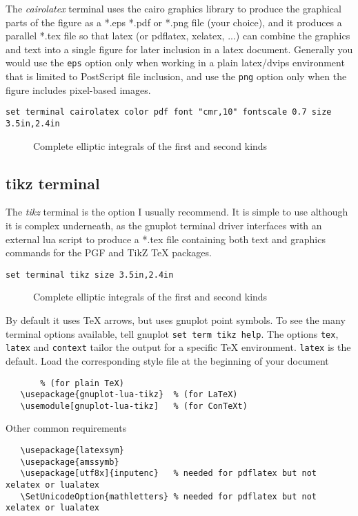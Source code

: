\documentclass[letterpaper,11pt]{article}
\newcommand{\gpinsetfigure}[2]{
  \begin{figure}[H]
  \centering
  
  \caption{#2}
  \end{figure}
}
\begin{document}
The {\em cairolatex} terminal uses the cairo graphics library to produce
the graphical parts of the figure as a *.eps *.pdf or *.png file (your choice),
and it produces a parallel *.tex file so that latex (or pdflatex, xelatex, ...)
can combine the graphics and text into a single figure for later inclusion in a
latex document.  Generally you would use the {\tt eps} option only when working
in a plain latex/dvips environment that is limited to PostScript file inclusion,
and use the {\tt png} option only when the figure includes pixel-based images.

\begin{verbatim}
set terminal cairolatex color pdf font "cmr,10" fontscale 0.7 size 3.5in,2.4in
\end{verbatim}
\gpinsetfigure{latex_cairo}
              {Complete elliptic integrals of the first and second kinds}


\subsection*{tikz terminal}

The {\em tikz} terminal is the option I usually recommend.
It is simple to use although it is complex underneath, as the gnuplot
terminal driver interfaces with an external lua script to produce a *.tex file
containing both text and graphics commands for the PGF and TikZ {\TeX} packages.

\begin{verbatim}
set terminal tikz size 3.5in,2.4in
\end{verbatim}
\gpinsetfigure{latex_tikz}
              {Complete elliptic integrals of the first and second kinds}

By default it uses {\TeX} arrows, but uses gnuplot point symbols.
To see the many terminal options available, tell gnuplot {\tt set term tikz help}.
The options {\tt tex}, {\tt latex} and {\tt context} tailor the output for
a specific {\TeX} environment.  {\tt latex} is the default.
Load the corresponding style file at the beginning of your document
\begin{verbatim}
       % (for plain TeX)
   \usepackage{gnuplot-lua-tikz}  % (for LaTeX)
   \usemodule[gnuplot-lua-tikz]   % (for ConTeXt)
\end{verbatim}
Other common requirements
\begin{verbatim}
   \usepackage{latexsym}
   \usepackage{amssymb}
   \usepackage[utf8x]{inputenc}   % needed for pdflatex but not xelatex or lualatex
   \SetUnicodeOption{mathletters} % needed for pdflatex but not xelatex or lualatex
\end{verbatim}
\end{document}

